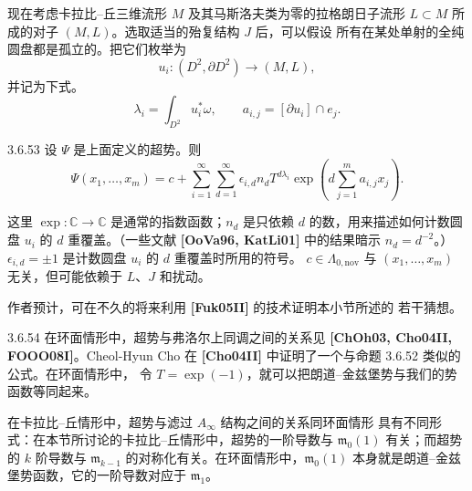 现在考虑卡拉比--丘三维流形 $M$ 及其马斯洛夫类为零的拉格朗日子流形
$L\subset M$ 所成的对子 $(M,L)$。选取适当的殆复结构 $J$ 后，可以假设
所有在某处单射的全纯圆盘都是孤立的。把它们枚举为
\[
  u_i\colon(D^2,\partial D^2)\longrightarrow(M,L),
\]
并记为下式。
\[
  \lambda_i=\int_{D^2}u_i^*\omega,
  \qquad
  a_{i,j}=[\partial u_i]\cap e_j.
\]

\begin{conjecture}{3.6.53}\label{conj:3-6-53}
设 $\Psi$ 是上面定义的超势。则
\[
  \Psi(x_1,\ldots,x_m)
  =c+\sum_{i=1}^{\infty}\sum_{d=1}^{\infty}
  \epsilon_{i,d}n_dT^{d\lambda_i}
  \exp\left(d\sum_{j=1}^m a_{i,j}x_j\right).
\]
\end{conjecture}

这里 $\exp\colon\mathbb C\to\mathbb C$ 是通常的指数函数；$n_d$ 是只依赖
$d$ 的数，用来描述如何计数圆盘 $u_i$ 的 $d$ 重覆盖。（一些文献
\textbf{[OoVa96, KatLi01]} 中的结果暗示 $n_d=d^{-2}$。）
$\epsilon_{i,d}=\pm1$ 是计数圆盘 $u_i$ 的 $d$ 重覆盖时所用的符号。
$c\in\Lambda_{0,\mathrm{nov}}$ 与 $(x_1,\ldots,x_m)$ 无关，但可能依赖于
$L$、$J$ 和扰动。

作者预计，可在不久的将来利用 \textbf{[Fuk05II]} 的技术证明本小节所述的
若干猜想。

\begin{remark}{3.6.54}\label{rem:3-6-54}
在环面情形中，超势与弗洛尔上同调之间的关系见
\textbf{[ChOh03, Cho04II, FOOO08I]}。Cheol-Hyun Cho 在
\textbf{[Cho04II]} 中证明了一个与命题 3.6.52 类似的公式。在环面情形中，
令 $T=\exp(-1)$，就可以把朗道--金兹堡势与我们的势函数等同起来。

在卡拉比--丘情形中，超势与滤过 $A_\infty$ 结构之间的关系同环面情形
具有不同形式：在本节所讨论的卡拉比--丘情形中，超势的一阶导数与
$\mathfrak m_0(1)$ 有关；而超势的 $k$ 阶导数与
$\mathfrak m_{k-1}$ 的对称化有关。在环面情形中，$\mathfrak m_0(1)$
本身就是朗道--金兹堡势函数，它的一阶导数对应于 $\mathfrak m_1$。
\end{remark}
